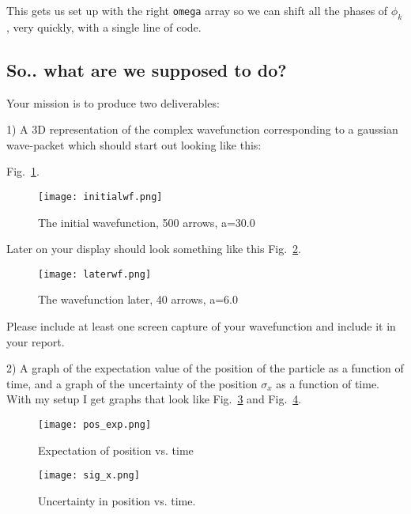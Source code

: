 \documentclass[11pt]{article} %
\begin{document}
This gets us set up with the right {\tt omega} array so we can shift all the phases of $\phi_k$, very quickly, with a single line of code.

\subsection*{So.. what are we supposed to do?}

Your mission is to produce two deliverables:

1) A 3D representation of the complex wavefunction corresponding to a gaussian wave-packet which should start out looking like this:

Fig.~\ref{fig:initialwf}.

\begin{figure}[htbp] %
   \centering
   \texttt{[image: initialwf.png]}
   \caption{The initial wavefunction, 500 arrows, a=30.0}
   \label{fig:initialwf}
\end{figure}

Later on your display should look something like this Fig.~\ref{fig:laterwf}.

\begin{figure}[htbp] %
   \centering
   \texttt{[image: laterwf.png]}
   \caption{The wavefunction later, 40 arrows, a=6.0}
   \label{fig:laterwf}
\end{figure}

Please include at least one screen capture of your wavefunction and include it in your report.

2) A graph of the expectation value of the position of the particle as a function of time, and a graph
of the uncertainty of the position $\sigma_x$ as a function of time. 
With my setup I get graphs that look like Fig.~\ref{fig:pos_exp} and Fig.~\ref{fig:sig_x}.

\begin{figure}[htbp] %
   \centering
   \texttt{[image: pos\_exp.png]}
   \caption{Expectation of position vs. time}
   \label{fig:pos_exp}
\end{figure}

\begin{figure}[htbp] %
   \centering
   \texttt{[image: sig\_x.png]}
   \caption{Uncertainty in position vs. time.}
   \label{fig:sig_x}
\end{figure}
\end{document}

